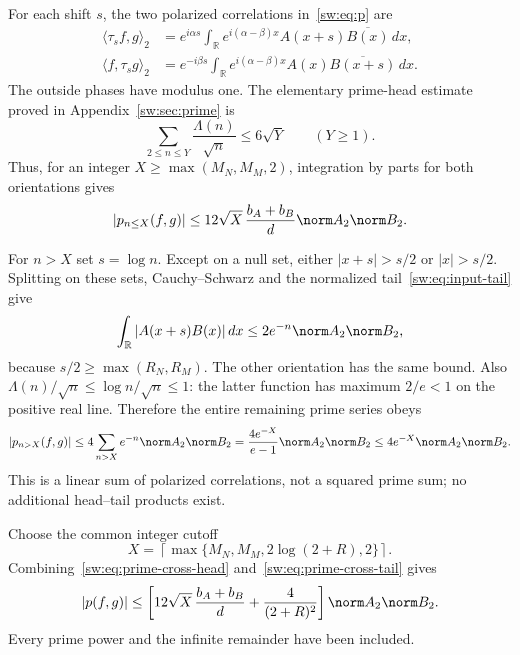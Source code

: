 \documentclass[11pt,a4paper]{article}
\numberwithin{equation}{section}
\theoremstyle{definition}\newtheorem{definition}[theorem]{Definition}
\theoremstyle{remark}\newtheorem{remark}[theorem]{Remark}
\newcommand{\R}{\mathbb R}\newcommand{\C}{\mathbb C}\newcommand{\N}{\mathbb N}
\begin{document}
For each shift $s$, the two polarized correlations in~\eqref{sw:eq:p} are
\begin{align*}
 \langle\tau_sf,g\rangle_2
   &=e^{i\alpha s}\int_\R e^{i(\alpha-\beta)x}A(x+s)\overline{B(x)}\,dx,\\
 \langle f,\tau_sg\rangle_2
   &=e^{-i\beta s}\int_\R e^{i(\alpha-\beta)x}A(x)\overline{B(x+s)}\,dx.
\end{align*}
The outside phases have modulus one. The elementary prime-head estimate proved in Appendix~\ref{sw:sec:prime} is
\begin{equation}\label{sw:eq:prime-head-input}
 \sum_{2\le n\le Y}\frac{\Lambda(n)}{\sqrt n}\le6\sqrt Y\qquad(Y\ge1).
\end{equation}
Thus, for an integer $X\ge\max(M_N,M_M,2)$, integration by parts for both orientations gives
\begin{equation}\label{sw:eq:prime-cross-head}
 |p_{n\le X}(f,g)|\le12\sqrt X\,\frac{b_A+b_B}{d}\norm A_2\norm B_2.
\end{equation}

For $n>X$ set $s=\log n$. Except on a null set, either $|x+s|>s/2$ or $|x|>s/2$. Splitting on these sets, Cauchy--Schwarz and the normalized tail~\eqref{sw:eq:input-tail} give
\[
 \int_\R |A(x+s)B(x)|\,dx\le2e^{-n}\norm A_2\norm B_2,
\]
because $s/2\ge\max(R_N,R_M)$. The other orientation has the same bound. Also $\Lambda(n)/\sqrt n\le\log n/\sqrt n\le1$: the latter function has maximum $2/e<1$ on the positive real line. Therefore the entire remaining prime series obeys
\begin{equation}\label{sw:eq:prime-cross-tail}
 |p_{n>X}(f,g)|\le4\sum_{n>X}e^{-n}\norm A_2\norm B_2
 =\frac{4e^{-X}}{e-1}\norm A_2\norm B_2
 \le4e^{-X}\norm A_2\norm B_2.
\end{equation}
This is a linear sum of polarized correlations, not a squared prime sum; no additional head--tail products exist.

Choose the common integer cutoff
\begin{equation}\label{sw:eq:Xcut}
 X=\left\lceil\max\{M_N,M_M,2\log(2+R),2\}\right\rceil.
\end{equation}
Combining~\eqref{sw:eq:prime-cross-head} and~\eqref{sw:eq:prime-cross-tail} gives
\begin{equation}\label{sw:eq:prime-cross}
 |p(f,g)|\le\left[12\sqrt X\,\frac{b_A+b_B}d
                     +\frac4{(2+R)^2}\right]\norm A_2\norm B_2.
\end{equation}
Every prime power and the infinite remainder have been included.
\end{document}
